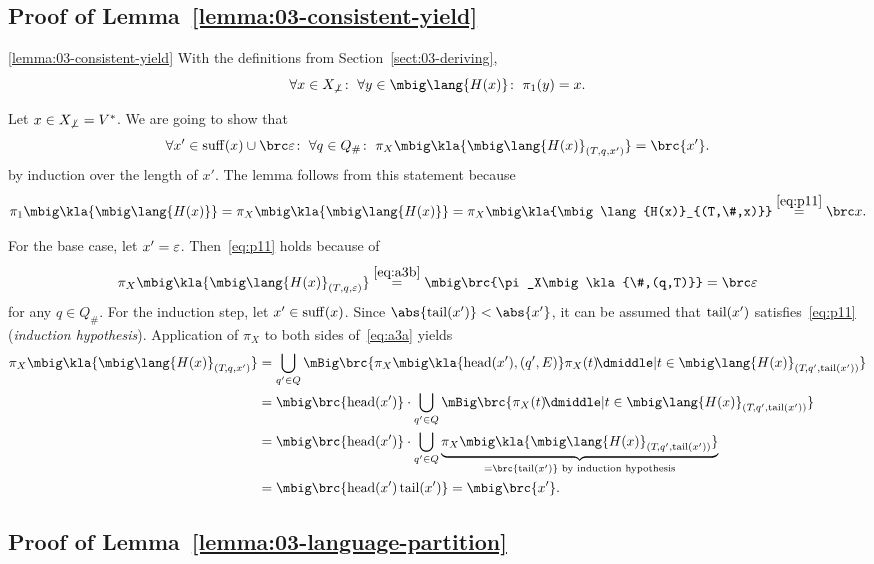 \subsection{Proof of Lemma~\ref{lemma:03-consistent-yield}}

\begin{repeatlemma}{\ref{lemma:03-consistent-yield}}
 With the definitions from Section~\ref{sect:03-deriving},
 \[
  \forall x\in X_{\not\bot}\colon\;
  \forall y\in \mbig\lang{H(x)}\colon\;
  \pi_1(y) = x.
 \]
\end{repeatlemma}

Let $x\in X_{\not\bot} = V^*$. We are going to show that
\begin{equation}\label{eq:p11}
 \forall x'\in\suff(x)\cup\brc\eps\colon\;
 \forall q\in Q_\#\colon\;
 \pi_X\mbig\kla{\mbig\lang{H(x)}_{(T,q,x')}} = \brc{x'}.
\end{equation}
by induction over the length of $x'$. The lemma follows from this statement because
\[
 \pi_1\mbig\kla{\mbig\lang{H(x)}}
 = \pi_X\mbig\kla{\mbig\lang{H(x)}}
 = \pi_X\mbig\kla{\mbig\lang{H(x)}_{(T,\#,x)}} \overset{\eqref{eq:p11}}= \brc x.
\]

For the base case, let $x' = \varepsilon$. Then~\eqref{eq:p11} holds because of
\[
 \pi_X\mbig\kla{\mbig\lang{H(x)}_{(T,q,\eps)}}
 \overset{\eqref{eq:a3b}}=
 \mbig\brc{\pi_X\mbig\kla{\#,(q,T)}} = \brc\eps
\]
for any $q\in Q_\#$. For the induction step, let $x'\in\operatorname{suff}(x)$. Since
$\abs{\cdr(x')} < \abs{x'}$, it can be assumed that $\operatorname{tail}(x')$
satisfies~\eqref{eq:p11} (\emph{induction hypothesis}). Application of $\pi_X$
to both sides of~\eqref{eq:a3a} yields
\begin{align*}
 \pi_X\mbig\kla{\mbig\lang{H(x)}_{(T\!,q,x')}}
 &= \bigcup_{q'\in Q}\mBig\brc{\pi_X\mbig\kla{\car(x'),(q',E)}\pi_X(t) \!\pipe t\in\mbig\lang{H(x)}_{(T\!,q',\cdr(x'))}} \\
 &= \mbig\brc{\car(x')} \cdot \bigcup_{q'\in Q}\mBig\brc{\pi_X(t) \!\pipe t\in\mbig\lang{H(x)}_{(T\!,q',\cdr(x'))}} \\
 &= \mbig\brc{\car(x')} \cdot \bigcup_{q'\in Q}\underbrace{\pi_X\mbig\kla{\mbig\lang{H(x)}_{(T\!,q',\cdr(x'))}}}_{=\brc{\cdr(x')}\text{ by induction hypothesis}} \\
 &= \mbig\brc{\car(x')\cdr(x')} = \mbig\brc{x'}.
\end{align*}

\subsection{Proof of Lemma~\ref{lemma:03-language-partition}}

